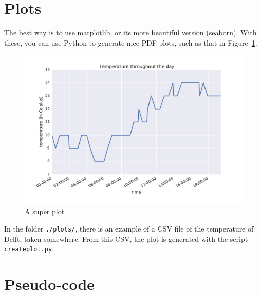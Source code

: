 %
\section{Plots}

The best way is to use \href{http://matplotlib.org}{matplotlib}, or its more beautiful version (\href{http://stanford.edu/~mwaskom/software/seaborn/index.html}{seaborn}).
With these, you can use Python to generate nice PDF plots, such as that in Figure~\ref{fig:myplot}.
\begin{figure}
  \centering
  \includegraphics[width=0.95\linewidth]{plots/myplot.pdf}
  \caption{A super plot}
\label{fig:myplot}
\end{figure}

In the folder \texttt{./plots/}, there is an example of a CSV file of the temperature of Delft, taken somewhere.
From this CSV, the plot is generated with the script \texttt{createplot.py}.


%
\section{Pseudo-code}
\label{sec:code}

